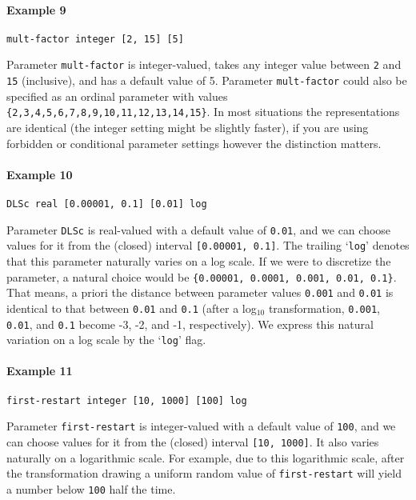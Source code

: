\documentclass[manual.tex]{subfiles}
\begin{document}
\paragraph{Example 9}
\begin{verbatim}
mult-factor integer [2, 15] [5]
\end{verbatim}
Parameter \texttt{mult-factor} is integer-valued, takes any integer value between \texttt{2} and \texttt{15} (inclusive), and has a default value of 5. Parameter \texttt{mult-factor} could also be specified as an ordinal parameter with values \texttt{\{2,3,4,5,6,7,8,9,10,11,12,13,14,15\}}. In most situations the representations are identical (the integer setting might be slightly faster), if you are using forbidden or conditional parameter settings however the distinction matters.



\paragraph{Example 10}
\begin{verbatim}
DLSc real [0.00001, 0.1] [0.01] log
\end{verbatim}
Parameter \texttt{DLSc} is real-valued with a default value of \texttt{0.01}, and we can choose values for it from the (closed) interval \texttt{[0.00001, 0.1]}.
The trailing `\texttt{log}' denotes that this parameter naturally varies on a log scale. If we were to discretize the parameter, a natural choice would be
\texttt{\{0.00001, 0.0001, 0.001, 0.01, 0.1\}}. That means, a priori the distance between parameter values \texttt{0.001} and \texttt{0.01} is identical to that between \texttt{0.01} and \texttt{0.1} (after a log$_{10}$ transformation, \texttt{0.001}, \texttt{0.01}, and \texttt{0.1} become -3, -2, and -1, respectively).
We express this natural variation on a log scale by the `\texttt{log}' flag. %

\paragraph{Example 11}
\begin{verbatim}
first-restart integer [10, 1000] [100] log
\end{verbatim}
Parameter \texttt{first-restart} is integer-valued with a default value of \texttt{100}, and we can choose values for it from the (closed) interval \texttt{[10, 1000]}.
It also varies naturally on a logarithmic scale. For example, due to this logarithmic scale, after the transformation drawing a uniform random value of \texttt{first-restart} will yield a number below \texttt{100} half the time.
\end{document}
